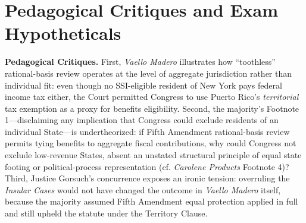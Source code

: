 \documentclass[12pt]{article}
\begin{document}
\section{Pedagogical Critiques and Exam Hypotheticals}
\textbf{Pedagogical Critiques.} First, \emph{Vaello Madero} illustrates how ``toothless'' rational-basis review operates at the level of aggregate jurisdiction rather than individual fit: even though no SSI-eligible resident of New York pays federal income tax either, the Court permitted Congress to use Puerto Rico's \emph{territorial} tax exemption as a proxy for benefits eligibility. Second, the majority's Footnote 1---disclaiming any implication that Congress could exclude residents of an individual State---is undertheorized: if Fifth Amendment rational-basis review permits tying benefits to aggregate fiscal contributions, why could Congress not exclude low-revenue States, absent an unstated structural principle of equal state footing or political-process representation (cf. \emph{Carolene Products} Footnote 4)? Third, Justice Gorsuch's concurrence exposes an ironic tension: overruling the \emph{Insular Cases} would not have changed the outcome in \emph{Vaello Madero} itself, because the majority assumed Fifth Amendment equal protection applied in full and still upheld the statute under the Territory Clause.
\end{document}
